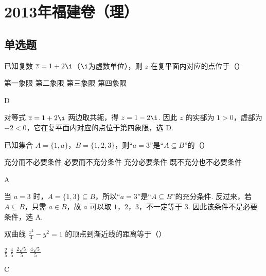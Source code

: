 \chapter{2013年福建卷（理）}

\section{单选题}

\begin{problem}
已知复数 \(\overline{z} = 1 + 2\i\)（\(\i\)为虚数单位），则 \(z\) 在复平面内对应的点位于（\quad）

\choices
    {第一象限}
    {第二象限}
    {第三象限}
    {第四象限}
\end{problem}

\begin{answer}
D
\end{answer}

\begin{solution}
对等式 \(\overline{z}=1+2\i\) 两边取共轭，得 \(z=1-2\i\). 因此 \(z\) 的实部为 \(1>0\)，虚部为 \(-2<0\)，它在复平面内对应的点位于第四象限，选 D.
\end{solution}

\begin{problem}
已知集合 \(A = \{1, a\}\)，\(B = \{1, 2, 3\}\)，则“\(a = 3\)”是“\(A \subseteq B\)”的（\quad）

\choices
    {充分而不必要条件}
    {必要而不充分条件}
    {充分必要条件}
    {既不充分也不必要条件}
\end{problem}

\begin{answer}
A
\end{answer}

\begin{solution}
当 \(a=3\) 时，\(A=\{1,3\}\subseteq B\)，所以“\(a=3\)”是“\(A\subseteq B\)”的充分条件. 反过来，若 \(A\subseteq B\)，只需 \(a\in B\)，故 \(a\) 可以取 \(1\)，\(2\)，\(3\)，不一定等于 \(3\). 因此该条件不是必要条件，选 A.
\end{solution}

\begin{problem}
双曲线 \(\frac{x^{2}}{4} - y^{2} = 1\) 的顶点到渐近线的距离等于（\quad）

\choices
    {\(\frac{2}{5}\)}
    {\(\frac{4}{5}\)}
    {\(\frac{2\sqrt{5}}{5}\)}
    {\(\frac{4\sqrt{5}}{5}\)}
\end{problem}

\begin{answer}
C
\end{answer}

